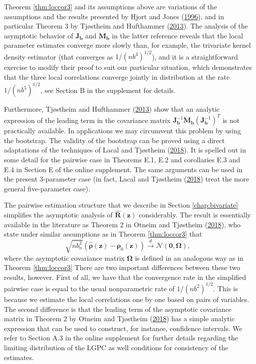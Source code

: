 \documentclass[
  12pt,
  letterpaper]{article}
\newcommand{\z}{\bm{z}}
\newcommand{\hR}{\widehat{\bm{R}}}
\newcommand{\frho}{\bm{\rho}}
\newcommand{\hfrho}{\widehat{\bm{\rho}}}
\newcommand{\hh}{\bm{b}}
\newcommand{\fOmega}{\bm{\Omega}}
\newcommand{\Jb}{\bm{J}_{\hh}}
\newcommand{\Mb}{\bm{M}_{\hh}}
\theoremstyle{definition}
\theoremstyle{definition}
\theoremstyle{definition}
\theoremstyle{remark}
\begin{document}
Theorem \ref{thm:loccor3} and its assumptions above are variations of the assumptions and the results presented by Hjort and Jones (\protect\hyperlink{ref-hjort1996locally}{1996}), and in particular Theorem 3 by Tjøstheim and Hufthammer (\protect\hyperlink{ref-tjostheim2013local}{2013}). The analysis of the asymptotic behavior of \(\Jb\) and \(\Mb\) in the latter reference reveals that the local parameter estimates converge more slowly than, for example, the trivariate kernel density estimator (that converges as \(1/(nb^3)^{1/2}\)), and it is a straightforward exercise to modify their proof to suit our particular situation, which demonstrates that the three local correlations converge jointly in distribution at the rate \(1/(nb^5)^{1/2}\), see Section B in the supplement for details.

Furthermore, Tjøstheim and Hufthammer (\protect\hyperlink{ref-tjostheim2013local}{2013}) show that an analytic expression of the leading term in the covariance matrix \(\Jb^{-1}\Mb(\Jb^{-1})^T\) is not practically available. In applications we may circumvent this problem by using the bootstrap. The validity of the bootstrap can be proved using a direct adaptations of the techniques of Lacal and Tjøstheim (\protect\hyperlink{ref-lacal2018estimating}{2018}). It is spelled out in some detail for the pairwise case in Theorems E.1, E.2 and corollaries E.3 and E.4 in Section E of the online supplement. The same arguments can be used in the present 3-parameter case (in fact, Lacal and Tjøstheim (\protect\hyperlink{ref-lacal2018estimating}{2018}) treat the more general five-parameter case).

The pairwise estimation structure that we describe in Section \ref{chap:bivariate} simplifies the asymptotic analysis of \(\hR(\z)\) considerably. The result is essentially available in the literature as Theorem 2 in Otneim and Tjøstheim (\protect\hyperlink{ref-otneim2017conditional}{2018}), who state under similar assumptions as in Theorem \ref{thm:loccor3} that
\begin{equation}
\sqrt{nb_n^2}\left(\hfrho(\z) - \frho_0(\z)\right) \stackrel{d}{\rightarrow} \mathcal{N}(\bm{0}, \fOmega),
\label{eq:ot2018}
\end{equation}
where the asymptotic covariance matrix \(\fOmega\) is defined in an analogous way as in Theorem \ref{thm:loccor3} There are two important differences between these two results, however. First of all, we have that the convergence rate in the simplified pairwise case is equal to the usual nonparametric rate of \(1/(nb^2)^{1/2}\). This is because we estimate the local correlations one by one based on pairs of variables. The second difference is that the leading term of the asymptotic covariance matrix in Theorem 2 by Otneim and Tjøstheim (\protect\hyperlink{ref-otneim2017conditional}{2018}) has a simple analytic expression that can be used to construct, for instance, confidence intervals. We refer to Section A.3 in the online supplement for further details regarding the limiting distribution of the LGPC as well conditions for consistency of the estimates.
\end{document}
